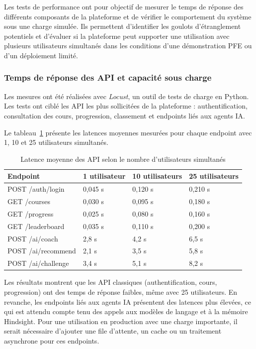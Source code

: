 Les tests de performance ont pour objectif de mesurer le temps de réponse des différents composants de la plateforme et de vérifier le comportement du système sous une charge simulée. Ils permettent d'identifier les goulots d'étranglement potentiels et d'évaluer si la plateforme peut supporter une utilisation avec plusieurs utilisateurs simultanés dans les conditions d'une démonstration PFE ou d'un déploiement limité.

\subsubsection{Temps de réponse des API et capacité sous charge}

Les mesures ont été réalisées avec \textit{Locust}, un outil de tests de charge en Python. Les tests ont ciblé les API les plus sollicitées de la plateforme : authentification, consultation des cours, progression, classement et endpoints liés aux agents IA.

Le tableau~\ref{tab:ch3_perf_latency} présente les latences moyennes mesurées pour chaque endpoint avec 1, 10 et 25 utilisateurs simultanés.

\begin{table}[H]
    \centering
    \caption{Latence moyenne des API selon le nombre d'utilisateurs simultanés}
    \label{tab:ch3_perf_latency}
    \begin{tabularx}{\textwidth}{|p{4cm}|X|X|X|}
        \hline
        \textbf{Endpoint} & \textbf{1 utilisateur} & \textbf{10 utilisateurs} & \textbf{25 utilisateurs} \\
        \hline
        POST /auth/login & 0,045 s & 0,120 s & 0,210 s \\
        \hline
        GET /courses & 0,030 s & 0,095 s & 0,180 s \\
        \hline
        GET /progress & 0,025 s & 0,080 s & 0,160 s \\
        \hline
        GET /leaderboard & 0,035 s & 0,110 s & 0,200 s \\
        \hline
        POST /ai/coach & 2,8 s & 4,2 s & 6,5 s \\
        \hline
        POST /ai/recommend & 2,1 s & 3,5 s & 5,8 s \\
        \hline
        POST /ai/challenge & 3,4 s & 5,1 s & 8,2 s \\
        \hline
    \end{tabularx}
\end{table}

Les résultats montrent que les API classiques (authentification, cours, progression) ont des temps de réponse faibles, même avec 25 utilisateurs. En revanche, les endpoints liés aux agents IA présentent des latences plus élevées, ce qui est attendu compte tenu des appels aux modèles de langage et à la mémoire Hindsight. Pour une utilisation en production avec une charge importante, il serait nécessaire d'ajouter une file d'attente, un cache ou un traitement asynchrone pour ces endpoints.

